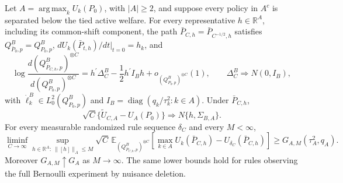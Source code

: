 Let \(A=\operatorname*{arg\,max}_kU_k(P_0)\), with \(|A|\geq2\), and suppose every policy in \(A^c\) is separated below the tied active welfare.  For every representative \(h\in\mathbb R^A\), including its common-shift component, the path \(\bar P_{C,h}=\bar P_{C^{-1/2},h}\) satisfies \(Q^B_{\bar P_0,p}=Q^B_{P_0,p}\), \(dU_k(\bar P_{t,h})/dt|_{t=0}=h_k\), and
\[
\log\frac{d(Q^B_{\bar P_{C,h},p})^{\otimes C}}{d(Q^B_{P_0,p})^{\otimes C}}
=h^{\prime}\Delta_C^B-\frac12h^{\prime}I_Bh+o_{(Q^B_{P_0,p})^{\otimes C}}(1),
\qquad \Delta_C^B\Rightarrow N(0,I_B),
\]
with \(\dot\ell_k^B\in L^2_0(Q^B_{P_0,p})\) and \(I_B=\operatorname{diag}(q_k/\tau_k^2:k\in A)\).  Under \(\bar P_{C,h}\),
\[
\sqrt C\{\widetilde U_{C,A}-U_A(P_0)\}\Rightarrow
N\{h,\Sigma_{B,A}\}.
\]
For every measurable randomized rule sequence \(\delta_C\) and every \(M<\infty\),
\[
\liminf_{C\to\infty}\sup_{h\in\mathbb R^A:\ \lVert[h]\rVert_A\leq M}
\sqrt C\,\mathbb E_{(Q^B_{\bar P_{C,h},p})^{\otimes C}}
\left[\max_{k\in A}U_k(\bar P_{C,h})-U_{\delta_C}(\bar P_{C,h})\right]
\geq G_{A,M}(\tau_A^2,q_A).
\]
Moreover \(G_{A,M}\uparrow G_A\) as \(M\to\infty\).  The same lower bounds hold for rules observing the full Bernoulli experiment by nuisance deletion.